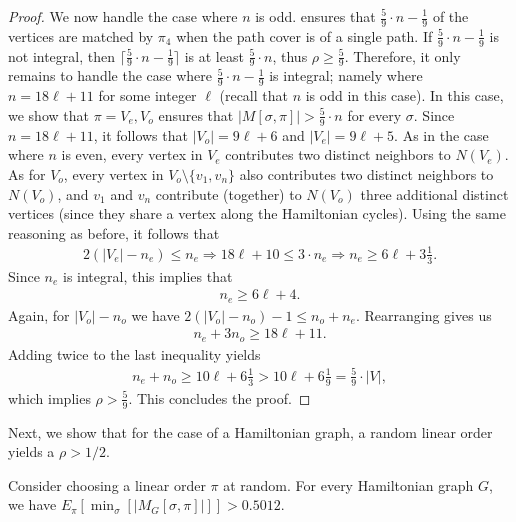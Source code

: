 \begin{proof}
	We now handle the case where $n$ is odd.  ensures that $\frac{5}{9}\cdot n -\frac{1}{9}$ of the vertices are matched by $\pi_4$ when the path cover is of a single path.
	If $\frac{5}{9}\cdot n -\frac{1}{9}$ is not integral, then $\lceil \frac{5}{9}\cdot n -\frac{1}{9}\rceil$ is at least $\frac{5}{9}\cdot n$, thus $\rho \geq \frac{5}{9}$.
	Therefore, it only remains to handle the case where $\frac{5}{9}\cdot n -\frac{1}{9}$ is integral;
	namely where $n=18\ell+11$ for some integer $\ell$ (recall that $n$ is odd in this case).
	In this case, we show that $\pi=V_e, V_o$ ensures that $|M[\sigma,\pi]|> \frac{5}{9}\cdot n$ for every $\sigma$. Since $n=18\ell+11$,
%
  it follows that $|V_o|=9\ell+6$ and $|V_e|=9\ell+5$. %
%
%
	As in the case where $n$ is even, every vertex in $V_e$ contributes two distinct neighbors to $N(V_e)$.
	As for $V_o$, every vertex in $V_o \setminus \{v_1,v_n\}$ also contributes two distinct neighbors to $N(V_o)$, and $v_1$ and $v_n$ contribute (together) to $N(V_o)$ three additional distinct vertices (since they share a vertex along the Hamiltonian cycles).
	Using the same reasoning as before, it follows that 
	\begin{eqnarray}
		2(|V_e|-n_e)\leq n_e\Rightarrow 18\ell+10\leq 3\cdot n_e\Rightarrow n_e\geq 6\ell+3\frac{1}{3}.
		\end{eqnarray}
	 Since $n_e$ is integral, this implies that
	\begin{eqnarray}
	n_e\geq 6\ell+4.
	\label{eq:eq1-hamilton}
	\end{eqnarray}
	Again, for $|V_o|-n_o$ we have $2(|V_o|-n_o)-1\leq n_o+n_e$. Rearranging gives us 
	\begin{eqnarray}
		n_e+3n_o\geq 18\ell+11.\end{eqnarray}
	Adding twice  to the last inequality yields \begin{eqnarray}
		n_e+n_o\geq 10\ell+6\frac{1}{3}>10\ell +6\frac{1}{9}=\frac{5}{9}\cdot |V|,\end{eqnarray} which implies $\rho >\frac{5}{9}$. %
	This concludes the proof.
\end{proof}

Next, we show that for the case of a Hamiltonian graph, a random linear order yields a $\rho>1/2$.

\begin{theorem}
  Consider choosing a linear order $\pi$
%
%
%
%
%
%
%
%
%
%
at random. For every Hamiltonian graph $G$,
%
we have  %
$E_{\pi}[\min_{\sigma}[|M_G[\sigma,\pi]|]] > 0.5012$.
	\label{thm:random-hamiltonian}
\end{theorem}	

